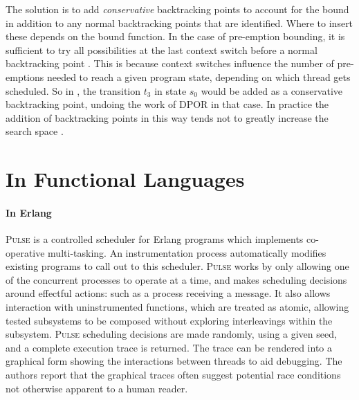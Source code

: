The solution is to add \emph{conservative} backtracking points to
account for the bound in addition to any normal backtracking points
that are identified.  Where to insert these depends on the bound
function.  In the case of pre-emption bounding, it is sufficient to
try all possibilities at the last context switch before a normal
backtracking point \parencite{coons2013}.  This is because context switches
influence the number of pre-emptions needed to reach a given program
state, depending on which thread gets scheduled.  So in
, the transition $t_3$ in state $s_0$ would be
added as a conservative backtracking point, undoing the work of DPOR
in that case.  In practice the addition of backtracking points in this
way tends not to greatly increase the search space \parencite{coons2013}.

\section{In Functional Languages}
\label{sec:sct-functional}

\paragraph{In Erlang}
\textsc{Pulse} \parencite{claessen2009} is a controlled scheduler for Erlang
programs which implements co-operative multi-tasking.  An
instrumentation process automatically modifies existing programs to
call out to this scheduler.  \textsc{Pulse} works by only allowing one
of the concurrent processes to operate at a time, and makes scheduling
decisions around effectful actions: such as a process receiving a
message.  It also allows interaction with uninstrumented functions,
which are treated as atomic, allowing tested subsystems to be composed
without exploring interleavings within the subsystem.  \textsc{Pulse}
scheduling decisions are made randomly, using a given seed, and a
complete execution trace is returned.  The trace can be rendered into
a graphical form showing the interactions between threads to aid
debugging.  The authors report that the graphical traces often suggest
potential race conditions not otherwise apparent to a human reader.

